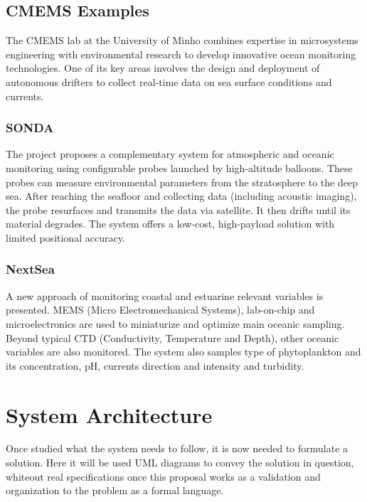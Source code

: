 \subsection{CMEMS Examples}
The CMEMS lab at the University of Minho combines expertise 
in microsystems engineering with environmental research to 
develop innovative ocean monitoring technologies. One of 
its key areas involves the design and deployment of autonomous 
drifters to collect real-time data on sea surface conditions 
and currents.

\subsubsection{SONDA}
The project proposes a complementary system for atmospheric
and oceanic monitoring using configurable probes launched by
high-altitude balloons. These probes can measure environmental
parameters from the stratosphere to the deep sea. After 
reaching the seafloor and collecting data (including acoustic 
imaging), the probe resurfaces and transmits the data via 
satellite. It then drifts until its material degrades. The 
system offers a low-cost, high-payload solution with 
limited positional accuracy.


\subsubsection{NextSea}
A new approach of monitoring coastal and estuarine relevant variables is presented. MEMS
(Micro Electromechanical Systems), lab-on-chip and microelectronics are used to 
miniaturize and optimize main oceanic sampling. Beyond typical CTD (Conductivity, Temperature
and Depth), other oceanic variables are also monitored. The system also samples type of
phytoplankton and its concentration, pH, currents direction and intensity and turbidity.

\section{System Architecture}

Once studied what the system needs to follow, it is now needed to formulate a solution.
Here it will be used UML diagrams to convey the solution in question, whiteout real specifications
once this proposal works as a validation and organization to the problem as a formal language.

